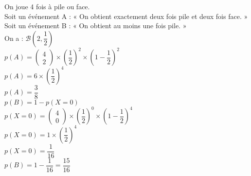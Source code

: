 On joue 4 fois à pile ou face. \\

Soit un événement A : « On obtient exactement deux fois pile et deux fois face. » \\

Soit un événement B : « On obtient au moins une fois pile. » \\

On a : $\mathcal{B} \left(2,\dfrac{1}{2}\right) $ \\

$p\left(A\right) = \left( \begin{array}{c} 4 \\ 2 \end{array} \right) \times \left(\dfrac{1}{2}\right)^2 \times \left( 1 - \dfrac{1}{2} \right)^2 $ \\

$ p\left(A\right) = 6 \times \left(\dfrac{1}{2} \right)^4 $ \\

$ p\left(A\right) = \dfrac{3}{8} $ \\

$ p\left(B\right) = 1 - p\left(X=0\right) $ \\

$p\left(X=0\right) = \left( \begin{array}{c} 4 \\ 0 \end{array} \right) \times \left(\dfrac{1}{2}\right)^0 \times \left(1 - \dfrac{1}{2} \right)^4 $ \\

$p\left(X=0\right) = 1 \times \left(\dfrac{1}{2}\right)^4 $ \\

$ p\left(X=0\right) = \dfrac{1}{16} $ \\

$ p\left(B\right) = 1 - \dfrac{1}{16} = \dfrac{15}{16} $ \\
 
